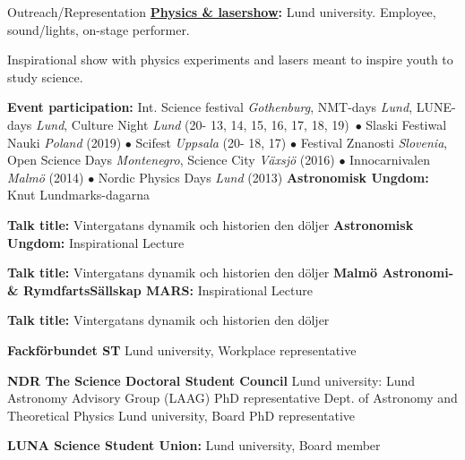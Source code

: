 \begin{rubric}{Outreach/Representation}
\entry*[2013 - current]%
\textbf{\href{https://www.facebook.com/Physicsandlasershow}{Physics \& lasershow}:} Lund university. Employee, sound/lights, on-stage performer. \par Inspirational show with physics experiments and lasers meant to inspire youth to study science. \par
\textbf{Event participation:} Int. Science festival \textit{Gothenburg}, NMT-days \textit{Lund}, LUNE-days \textit{Lund}, Culture Night \textit{Lund} (20- 13, 14, 15, 16, 17, 18, 19)\ $\bullet$ Slaski Festiwal Nauki \textit{Poland} (2019)  $\bullet$ Scifest \textit{Uppsala} (20- 18, 17) $\bullet$ Festival Znanosti \textit{Slovenia}, Open Science Days \textit{Montenegro}, Science City \textit{Växsjö} (2016) $\bullet$ Innocarnivalen \textit{Malmö} (2014) $\bullet$ Nordic Physics Days \textit{Lund} (2013)
\entry*[2021]
%
\textbf{Astronomisk Ungdom:} Knut Lundmarks-dagarna \par 
\textbf{Talk title:} Vintergatans dynamik och historien den döljer
\entry*[2020]
%
\textbf{Astronomisk Ungdom:} Inspirational Lecture \par 
\textbf{Talk title:} Vintergatans dynamik och historien den döljer
\entry*[2020]
%
\textbf{Malmö Astronomi- \& RymdfartsSällskap MARS:} Inspirational Lecture \par 
\textbf{Talk title:} Vintergatans dynamik och historien den döljer

\entry*[2021-2022]%
\textbf{Fackförbundet ST} Lund university, Workplace representative\par

%
\entry*[]
\textbf{NDR The Science Doctoral Student Council} Lund university:
\entry*[\prefix{}2020-] Lund Astronomy Advisory Group (LAAG) PhD representative
\entry*[2017-2018] Dept. of Astronomy and Theoretical Physics Lund university, Board PhD representative\par
{}%
\textbf{LUNA Science Student Union:} Lund university, Board member \par

\end{rubric}